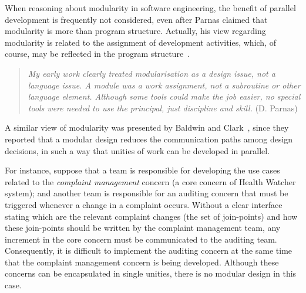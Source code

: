 When reasoning about modularity in software engineering,
the benefit of parallel development is frequently not considered, even after
Parnas claimed that modularity is more than program structure. Actually,
his view regarding modularity is related to the assignment of development
activities, which, of course, may be reflected in the program
structure~\cite{parnas-icse-03}.

\begin{quote}\emph{
My early work clearly treated modularisation as a design
issue, not a language issue. A module was a work assignment,
not a subroutine or other language element. Although
some tools could make the job easier, no special tools were
needed to use the principal, just discipline and skill.}
(D. Parnas)
\end{quote}



A similar view of modularity was presented by Baldwin and
Clark~\cite{clark-design-rules-book},  since they
reported that a modular design reduces the communication paths among
design decisions, in such a way that unities of work can be developed
in parallel.

For instance, suppose that a team is responsible for developing
the use cases related to the \emph{complaint management} concern (a core concern
of Health Watcher system); and another team is responsible
for an auditing concern that must be triggered whenever a change in a
complaint occurs. Without a clear interface stating which are the relevant
complaint changes (the set of join-points) and how these join-points should be
written by the complaint management team, any increment in the core concern
must be communicated to the auditing team. Consequently, it is difficult to
implement the auditing concern at the same time that the complaint management
concern is being developed. Although these concerns can be encapsulated in
single unities, there is no modular design in this case.

